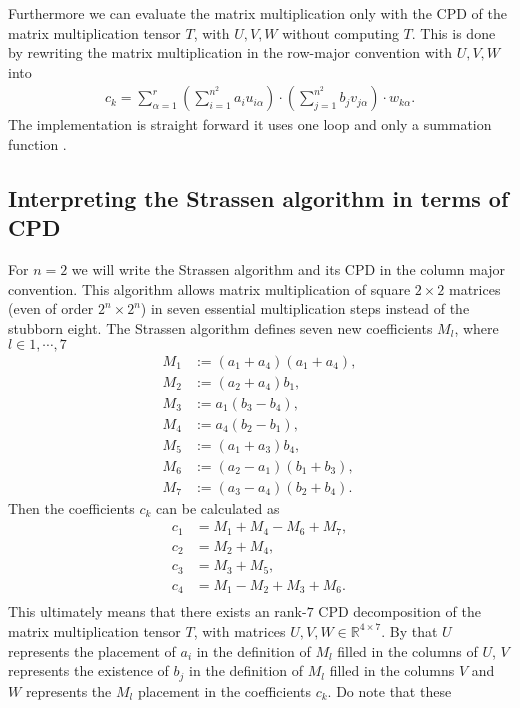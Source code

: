 \documentclass[a4paper]{article}
\begin{document}
Furthermore we can evaluate the matrix multiplication only with the CPD of the
matrix multiplication tensor $T$, with $U, V, W$ without computing $T$. This
is done by rewriting the matrix multiplication in the row-major convention
with $U, V, W$ into
\begin{align}
    c_k = \sum_{\alpha=1}^r \left(\sum_{i=1}^{n^2} a_i
    u_{i\alpha}\right)\cdot
        \left(\sum_{j = 1}^{n^2} b_j v_{j\alpha}\right) \cdot w_{k\alpha}.
\end{align}
The implementation is straight forward it uses one loop and only a
summation function \cite{code}.
\subsection{Interpreting the Strassen algorithm in terms of CPD}
For $n=2$ we will write the Strassen algorithm and its CPD in the column
major convention. This algorithm allows matrix multiplication of square
$2\times2$ matrices (even of order $2^n\times 2^n$) in seven essential
multiplication steps instead of the stubborn eight. The Strassen algorithm
defines seven new coefficients $M_l$, where $l\in {1, \cdots, 7}$
\begin{align}
    M_1 &:= (a_1 + a_4)(a_1 + a_4), \\
    M_2 &:= (a_2 + a_4)b_1,\\
    M_3 &:= a_1(b_3 - b_4),\\
    M_4 &:= a_4(b_2 - b_1),\\
    M_5 &:= (a_1 + a_3)b_4,\\
    M_6 &:= (a_2 - a_1)(b_1 + b_3),\\
    M_7 &:= (a_3 - a_4)(b_2 + b_4).
\end{align}
Then the coefficients $c_k$ can be calculated as
\begin{align}
    c_1 &= M_1 + M_4 - M_6 + M_7,\\
    c_2 &= M_2 + M_4,\\
    c_3 &= M_3 + M_5,\\
    c_4 &= M_1 - M_2 + M_3 + M_6.\\
\end{align}
This ultimately means that there exists an rank-$7$ CPD decomposition of the
matrix multiplication tensor $T$, with matrices $U, V, W \in
\mathbb{R}^{4\times 7}$. By that $U$ represents the placement of $a_i$ in the
definition of $M_l$ filled in the columns of $U$, $V$ represents the existence
of $b_j$ in the definition of $M_l$ filled in the columns $V$ and $W$
represents the $M_l$ placement in the coefficients $c_k$. Do note that these
\end{document}
